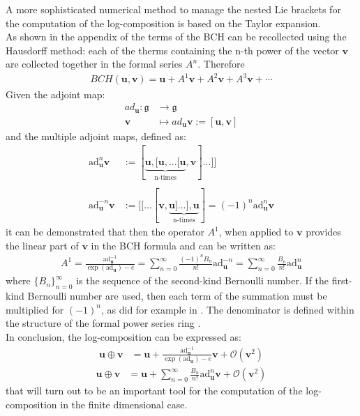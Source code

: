 A more sophisticated numerical method to manage the nested Lie brackets for the computation of the log-composition is based on the Taylor expansion. \\
As shown in the appendix of \cite{klarsfeld1989baker} the terms of the BCH can be recollected using the Hausdorff method: each of the therms containing the n-th power of the vector $\mathbf{v}$ are collected together in the formal series $A^{n}$. Therefore
\begin{align*}
BCH(\mathbf{u},\mathbf{v}) 
= 
\mathbf{u} + A^{1} \mathbf{v} + A^{2} \mathbf{v} + A^{3} \mathbf{v} + \cdots
\end{align*}
Given the adjoint map:
\begin{align*}
ad_{\mathbf{u}} : \mathfrak{g}  & \longrightarrow \mathfrak{g}  
\\
\mathbf{v} &\longmapsto ad_{\mathbf{u}}   \mathbf{v} :=  [\mathbf{u}, \mathbf{v}]
\end{align*}
and the multiple adjoint maps, defined as:
\begin{align*}
\text{ad}_{\mathbf{u}}^{n} \mathbf{v} 
&:= [  \underbrace{   \mathbf{u},[\mathbf{u},... [\mathbf{u}}_{\text{n-times}},\mathbf{v}]...]] 
\\
\\
\text{ad}_{\mathbf{u}}^{-n} \mathbf{v} 
&:= [[...[  \mathbf{v}, \underbrace{   \mathbf{u}]...],\mathbf{u}}_{\text{n-times}}]
= (-1)^n \text{ad}_{\mathbf{u}}^{n} \mathbf{v} 
\end{align*}
it can be demonstrated that then the operator $A^{1}$, when applied to $\mathbf{v}$ provides the linear part of $\mathbf{v}$ in the BCH formula and can be written as:
\begin{align*}
A^{1}
= 
\frac{  
	\text{ad}_{\mathbf{u}}^{-1} 
	}{
	\exp{(\text{ad}_{\mathbf{u}})}-e
	}
=
\sum_{n=0}^{\infty} \frac{(-1)^nB_{n}}{n!} \text{ad}_{\mathbf{u}}^{ - n} 
=
\sum_{n=0}^{\infty} \frac{B_{n}}{n!} \text{ad}_{\mathbf{u}}^{ n} 
\end{align*}
where $\lbrace B_{n} \rbrace_{n=0}^{\infty} $ is the sequence of the second-kind Bernoulli number. If the first-kind Bernoulli number are used, then each term of the summation must be multiplied for $(-1)^{n}$, as did for example in \cite{klarsfeld1989baker}. The denominator is defined within the structure of the formal power series ring \cite{mariconda2013calcolo}.\\
In conclusion, the log-composition can be expressed as:
\begin{align*}
\mathbf{u}\oplus \mathbf{v}  
&= 
\mathbf{u} + 
\frac{  
	\text{ad}_{\mathbf{u}}^{-1} 
}{
\exp{(\text{ad}_{\mathbf{u}})}-e
} \mathbf{v}  
+ 
\mathcal{O}(\mathbf{v} ^2) 
\end{align*}
\begin{align}\label{eq:taylor}
\mathbf{u}\oplus \mathbf{v}  
&=
\mathbf{u} 
+
\sum_{n=0}^{\infty} \frac{B_{n}}{n!} \text{ad}_{\mathbf{u}}^{ n} 
\mathbf{v}  
+
\mathcal{O}(\mathbf{v} ^2)
\end{align}
that will turn out to be an important tool for the computation of the log-composition in the finite dimensional case. 

